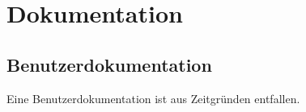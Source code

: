 \section{Dokumentation}
\subsection{Benutzerdokumentation}
Eine Benutzerdokumentation ist aus Zeitgründen entfallen.
